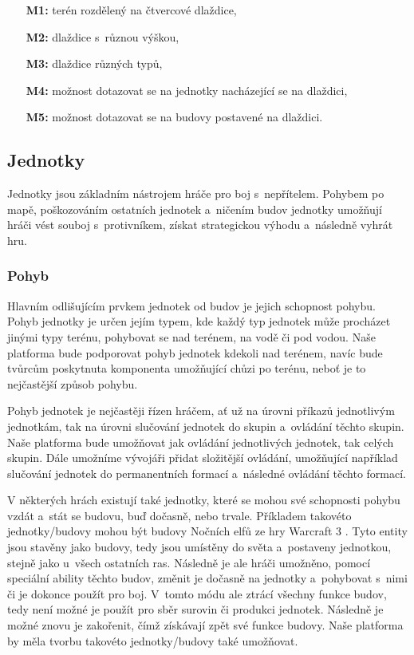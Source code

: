 \begin{itemize}
	\item[\textbf{M1:}] terén rozdělený na čtvercové dlaždice,
	\item[\textbf{M2:}] dlaždice s~různou výškou,
	\item[\textbf{M3:}] dlaždice různých typů,
	\item[\textbf{M4:}] možnost dotazovat se na jednotky nacházející se na dlaždici,
	\item[\textbf{M5:}] možnost dotazovat se na budovy postavené na dlaždici.
\end{itemize}
\subsection{Jednotky}
\label{sec:jednotky}
Jednotky jsou základním nástrojem hráče pro boj s~nepřítelem. Pohybem po mapě, poškozováním ostatních jednotek a~ničením budov jednotky umožňují hráči vést souboj s~protivníkem, získat strategickou výhodu a~následně vyhrát hru. 

\subsubsection{Pohyb}
Hlavním odlišujícím prvkem jednotek od budov je jejich schopnost pohybu. Pohyb jednotky je určen jejím typem, kde každý typ jednotek může procházet jinými typy terénu, pohybovat se nad terénem, na vodě či pod vodou. Naše platforma bude podporovat pohyb jednotek kdekoli nad terénem, navíc bude tvůrcům poskytnuta komponenta umožňující chůzi po terénu, neboť je to nejčastější způsob pohybu. 

Pohyb jednotek je nejčastěji řízen hráčem, ať už na úrovni příkazů jednotlivým jednotkám, tak na úrovni slučování jednotek do skupin a~ovládání těchto skupin. Naše platforma bude umožňovat jak ovládání jednotlivých jednotek, tak celých skupin. Dále umožníme vývojáři přidat složitější ovládání, umožňující například slučování jednotek do permanentních formací a~následné ovládání těchto formací. 

V některých hrách existují také jednotky, které se mohou své schopnosti pohybu vzdát a~stát se budovu, buď dočasně, nebo trvale. Příkladem takovéto jednotky/budovy mohou být budovy Nočních elfů ze hry Warcraft 3 \citep{site:warcraft3}. Tyto entity jsou stavěny jako budovy, tedy jsou umístěny do světa a~postaveny jednotkou, stejně jako u~všech ostatních ras. Následně je ale hráči umožněno, pomocí speciální ability těchto budov, změnit je dočasně na jednotky a~pohybovat s~nimi či je dokonce použít pro boj. V~tomto módu ale ztrácí všechny funkce budov, tedy není možné je použít pro sběr surovin či produkci jednotek. Následně je možné znovu je zakořenit, čímž získávají zpět své funkce budovy.  Naše platforma by měla tvorbu takovéto jednotky/budovy také umožňovat. 

